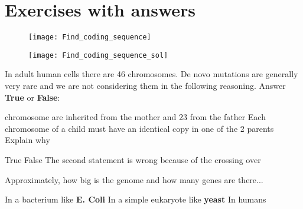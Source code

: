 \chapter{Exercises with answers}

\begin{Exercise} [
  title={Coding sequence},
  difficulty={1},
  label={excs},
  origin={G. Valle}
 ]
 
 \begin{figure}[H]
  \centering
  \texttt{[image: Find\_coding\_sequence]}
 \end{figure}

\end{Exercise}

\newpage

\begin{Answer} [
  ref={excs},
  number={1}
 ]
 
 \begin{figure}[H]
  \centering
  \texttt{[image: Find\_coding\_sequence\_sol]}
 \end{figure}

\end{Answer}



\begin{Exercise} [
  title={Chromosomes},
  difficulty={1},
  label={ex1},
  origin={G. Valle}
 ]

  In adult human cells there are 46 chromosomes. De novo mutations are generally
very rare and we are not considering them in the following reasoning.
Answer \textbf{True} or \textbf{False}:

   chromosome are inherited from the mother and 23 from the father
  \Question Each chromosome of a child must have an identical copy in one of the
2 parents
  \subQuestion Explain why
\end{Exercise}

\begin{Answer} [
   ref={ex1},
   number={1}
 ]

  \Question True
  \Question False
  \subQuestion The second statement is wrong because of the crossing over

\end{Answer}


\begin{Exercise} [
  title={Genomes and genes},
  difficulty={1},
  label={ex2},
  origin={G. Valle}
 ]

  Approximately, how big is the genome and how many genes are there...

  \Question In a bacterium like \textbf{E. Coli}
  \Question In a simple eukaryote like \textbf{yeast}
  \Question In humans

\end{Exercise}

